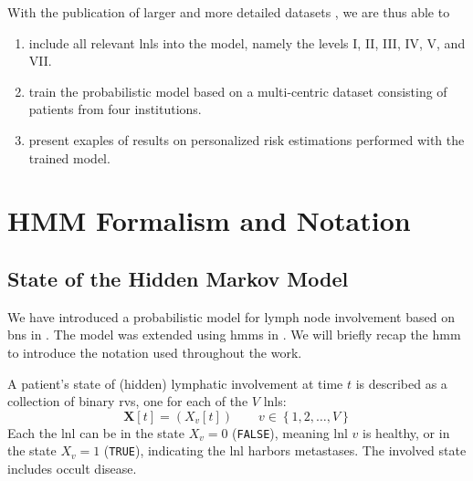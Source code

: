 \documentclass[twocolumn]{aastex631}
\begin{document}
With the publication of larger and more detailed datasets \cite{ludwig_dataset_2022}, we are thus able to
\begin{enumerate}
    \item include all relevant \glspl{lnl} into the model, namely the levels I, II, III, IV, V, and VII.
    \item train the probabilistic model based on a multi-centric dataset consisting of  patients from four institutions.
    \item present exaples of results on personalized risk estimations performed with the trained model.
\end{enumerate}



\section{HMM Formalism and Notation}
\label{sec:formalism}



\subsection{State of the Hidden Markov Model}
\label{subsec:formalism:state}

We have introduced a probabilistic model for lymph node involvement based on \glspl{bn} in \cite{pouymayou_bayesian_2019}. The model was extended using \glspl{hmm} in \cite{ludwig_hidden_2021}. We will briefly recap the \acrlong{hmm} to introduce the notation used throughout the work.

A patient's state of (hidden) lymphatic involvement at time $t$ is described as a collection of binary \glspl{rv}, one for each of the $V$ \glspl{lnl}:
%
\begin{equation}
    \mathbf{X}[t] = \left( X_v[t] \right) \qquad v \in \left\{ 1,2, \ldots, V \right\}
\end{equation}
%
Each the \gls{lnl} can be in the state $X_v=0$ (\texttt{FALSE}), meaning \gls{lnl} $v$ is healthy, or in the state $X_v=1$ (\texttt{TRUE}), indicating the \gls{lnl} harbors metastases. The involved state includes occult disease.
\end{document}
